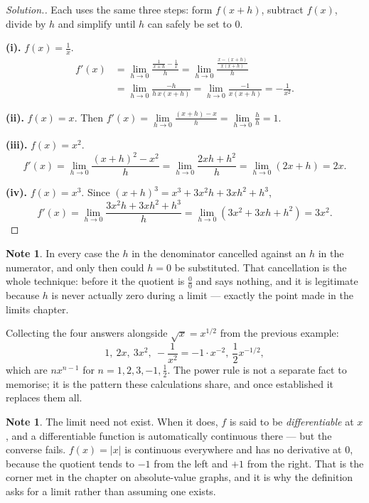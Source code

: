 \documentclass[11pt,a4paper]{article}
\theoremstyle{definition}
\newtheorem{note}[thm]{Note}
\newenvironment{solution}
  {\renewcommand{\qedsymbol}{}\begin{proof}[\textit{Solution}.]}
  {\end{proof}}
\begin{document}
\begin{solution}
Each uses the same three steps: form $f(x+h)$, subtract $f(x)$, divide by $h$ and
simplify until $h$ can safely be set to $0$.

\textbf{(i).} $f(x)=\frac{1}{x}$.
\begin{align*}
f'(x)&=\lim_{h\to 0}\frac{\frac{1}{x+h}-\frac{1}{x}}{h}
      =\lim_{h\to 0}\frac{\frac{x-(x+h)}{x(x+h)}}{h}\\
     &=\lim_{h\to 0}\frac{-h}{h\,x(x+h)}
      =\lim_{h\to 0}\frac{-1}{x(x+h)}=-\frac{1}{x^{2}} .
\end{align*}

\textbf{(ii).} $f(x)=x$. Then
$f'(x)=\lim\limits_{h\to 0}\frac{(x+h)-x}{h}=\lim\limits_{h\to 0}\frac{h}{h}=1$.

\textbf{(iii).} $f(x)=x^{2}$.
$$f'(x)=\lim_{h\to 0}\frac{(x+h)^{2}-x^{2}}{h}
=\lim_{h\to 0}\frac{2xh+h^{2}}{h}=\lim_{h\to 0}(2x+h)=2x .$$

\textbf{(iv).} $f(x)=x^{3}$. Since
$(x+h)^{3}=x^{3}+3x^{2}h+3xh^{2}+h^{3}$,
$$f'(x)=\lim_{h\to 0}\frac{3x^{2}h+3xh^{2}+h^{3}}{h}
=\lim_{h\to 0}\left(3x^{2}+3xh+h^{2}\right)=3x^{2} .$$
\end{solution}

\begin{note}
In every case the $h$ in the denominator cancelled against an $h$ in the numerator,
and only then could $h=0$ be substituted. That cancellation is the whole technique:
before it the quotient is $\frac{0}{0}$ and says nothing, and it is legitimate
because $h$ is never actually zero during a limit --- exactly the point made in the
limits chapter.

Collecting the four answers alongside $\sqrt{x}=x^{1/2}$ from the previous example:
$$1,\ 2x,\ 3x^{2},\ -\frac{1}{x^{2}}=-1\cdot x^{-2},\
\frac{1}{2}x^{-1/2},$$
which are $nx^{n-1}$ for $n=1,2,3,-1,\frac{1}{2}$. The power rule is not a separate
fact to memorise; it is the pattern these calculations share, and once established
it replaces them all.
\end{note}
\pagebreak
\begin{note}
The limit need not exist. When it does, $f$ is said to be \emph{differentiable} at
$x$, and a differentiable function is automatically continuous there --- but the
converse fails. $f(x)=\left|x\right|$ is continuous everywhere and has no
derivative at $0$, because the quotient tends to $-1$ from the left and $+1$ from
the right. That is the corner met in the chapter on absolute-value graphs, and it
is why the definition asks for a limit rather than assuming one exists.
\end{note}
\end{document}
